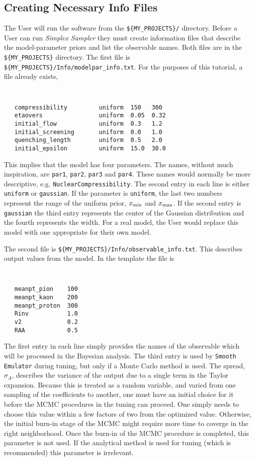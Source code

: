 \documentclass[UserManual.tex]{subfiles}
\begin{document}
\subsection{Creating Necessary Info Files}
The User will run the software from the {\tt \$\{MY\_PROJECTS\}/} directory. Before a User can run {\it Simplex Sampler} they must create information files that describe the model-parameter priors and list the observable names. Both files are in the {\tt \$\{MY\_PROJECTS\}} directory. The first file is {\tt \$\{MY\_PROJECTS\}/Info/modelpar\_info.txt}. For the purposes of this tutorial, a file already exists,
{\tt
\begin{verbatim}
   compressibility         uniform  150   300
   etaovers                uniform  0.05  0.32
   initial_flow            uniform  0.3   1.2
   initial_screening       uniform  0.0   1.0
   quenching_length        uniform  0.5   2.0
   initial_epsilon         uniform  15.0  30.0
\end{verbatim}
}
This implies that the model has four parameters. The names, without much inspiration, are {\tt par1}, {\tt par2}, {\tt par3} and {\tt par4}. These names would normally be more descriptive, e.g. {\tt NuclearCompressibility}. The second entry in each line is either {\tt uniform} or {\tt gaussian}. If the parameter is {\tt uniform}, the last two numbers represent the range of the uniform prior, $x_{\rm min}$ and $x_{\rm max}$. If the second entry is {\tt gaussian} the third entry represents the center of the Gaussian distribution and the fourth represents the width. For a real model, the User would replace this model with one appropriate for their own model.

The second file is {\tt \$\{MY\_PROJECTS\}/Info/observable\_info.txt}. This describes output values from the model. In the template the file is
{\tt
\begin{verbatim}
   meanpt_pion    100      
   meanpt_kaon    200      
   meanpt_proton  300      
   Rinv           1.0      
   v2             0.2     
   RAA            0.5
\end{verbatim}
}
The first entry in each line simply provides the names of the observable which will be processed in the Bayesian analysis.  The third entry is used by {\tt Smooth Emulator} during tuning, but only if a Monte Carlo method is used. The spread, $\sigma_A$, describes the variance of the output due to a single term in the Taylor expansion. Because this is treated as a random variable, and varied from one sampling of the coefficients to another, one must have an initial choice for it before the MCMC procedures in the tuning can proceed. One simply needs to choose this value within a few factors of two from the optimized value. Otherwise, the initial burn-in stage of the MCMC might require more time to coverge in the right neighborhood. Once the burn-in of the MCMC procedure is completed, this parameter is not used. If the analytical method is used for tuning (which is recommended) this parameter is irrelevant.
\end{document}
